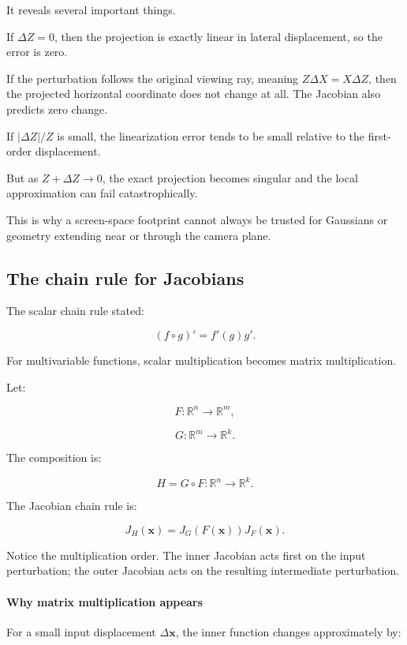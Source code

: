 It reveals several important things.

If \(\Delta Z=0\), then the projection is exactly linear in lateral displacement, so the error is zero.

If the perturbation follows the original viewing ray, meaning \(Z\Delta X=X\Delta Z\), then the projected horizontal coordinate does not change at all. The Jacobian also predicts zero change.

If \(|\Delta Z|/Z\) is small, the linearization error tends to be small relative to the first-order displacement.

But as \(Z+\Delta Z\to0\), the exact projection becomes singular and the local approximation can fail catastrophically.

This is why a screen-space footprint cannot always be trusted for Gaussians or geometry extending near or through the camera plane.

\subsection{The chain rule for Jacobians}\label{02-foundations-ii-ch021-the-chain-rule-for-jacobians}

The scalar chain rule stated:

\[
(f\circ g)'=f'(g)g'.
\]

For multivariable functions, scalar multiplication becomes matrix multiplication.

Let:

\[
F:\mathbb R^n\rightarrow\mathbb R^m,
\]

\[
G:\mathbb R^m\rightarrow\mathbb R^k.
\]

The composition is:

\[
H=G\circ F:\mathbb R^n\rightarrow\mathbb R^k.
\]

The Jacobian chain rule is:

\[
\boxed{ J_H(\mathbf x) = J_G(F(\mathbf x))J_F(\mathbf x) }.
\]

Notice the multiplication order. The inner Jacobian acts first on the input perturbation; the outer Jacobian acts on the resulting intermediate perturbation.

\paragraph{Why matrix multiplication appears}\label{02-foundations-ii-ch021-why-matrix-multiplication-appears}

For a small input displacement \(\Delta\mathbf x\), the inner function changes approximately by:

